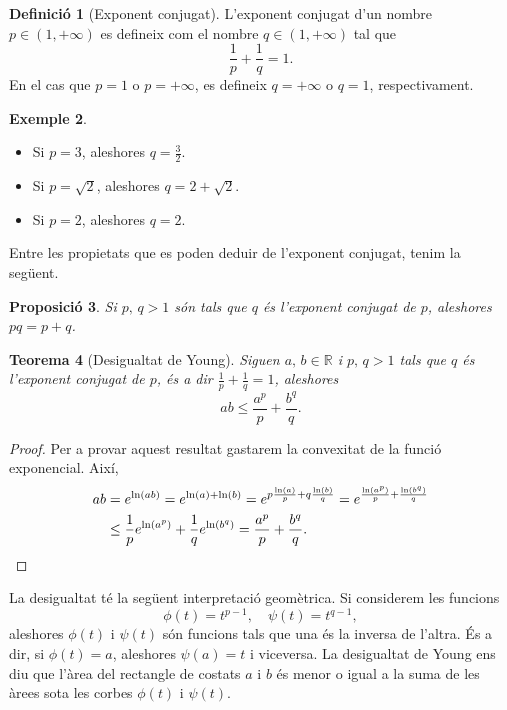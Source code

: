 \documentclass[12pt]{book}
\newtheorem{teorema}{Teorema}[chapter]
\newtheorem{prop}[teorema]{Proposició}
\theoremstyle{definition}
\newtheorem{defi}[teorema]{Definició}
\theoremstyle{nota}
\theoremstyle{exemple}
\newtheorem{exemple}[teorema]{Exemple}
\begin{document}
\begin{defi}[Exponent conjugat]
  L'exponent conjugat d'un nombre $p \in (1, +\infty)$ es defineix com
  el nombre $q \in (1, +\infty)$ tal que
  \[
    \frac{1}{p} + \frac{1}{q} = 1.
  \]
  En el cas que $p = 1$ o $p = +\infty$, es defineix $q = +\infty$ o
  $q = 1$, respectivament.
\end{defi}

\begin{exemple}
  \begin{itemize}[nosep]
  \item Si $p=3$, aleshores $q = \frac{3}{2}$.
  \item Si $p = \sqrt{2}$, aleshores $q = 2 + \sqrt{2}$.
  \item Si $p = 2$, aleshores $q = 2$.
  \end{itemize}
\end{exemple}

Entre les propietats que es poden deduir de l'exponent conjugat, tenim
la següent.

\begin{prop}
  Si $p,\, q > 1$ són tals que $q$ és l'exponent conjugat de $p$,
  aleshores $pq = p + q$.
\end{prop}

\begin{teorema}[Desigualtat de Young]
  Siguen $a,\, b \in \mathbb{R}$ i $p,\, q > 1$ tals que $q$ és
  l'exponent conjugat de $p$, és a dir
  $\frac{1}{p} + \frac{1}{q} = 1$, aleshores
  \[
    ab \leq \frac{a^p}{p} + \frac{b^q}{q}.
  \]
\end{teorema}

\begin{proof}
  Per a provar aquest resultat gastarem la convexitat de la funció
  exponencial. Així,
  \begin{align*}
    ab &= e^{\ln(ab)} = e^{\ln(a) + \ln(b)}
         = e^{p \frac{\ln(a)}{p} + q \frac{\ln(b)}{q}}
         = e^{\frac{\ln(a^p)}{p}+\frac{\ln(b^q)}{q}} \\
       &\leq \frac{1}{p} e^{\ln(a^p)} + \frac{1}{q} e^{\ln(b^q)}
         = \frac{a^p}{p} + \frac{b^q}{q}.\qedhere
  \end{align*}
\end{proof}

La desigualtat té la següent interpretació geomètrica. Si considerem
les funcions
\[
  \phi(t) = t^{p-1}, \quad \psi(t) = t^{q-1},
\]
aleshores $\phi(t)$ i $\psi(t)$ són funcions tals que una és la
inversa de l'altra. És a dir, si $\phi(t) = a$, aleshores
$\psi(a) = t$ i viceversa. La desigualtat de Young ens diu que l'àrea
del rectangle de costats $a$ i $b$ és menor o igual a la suma de les
àrees sota les corbes $\phi(t)$ i $\psi(t)$.
\end{document}
